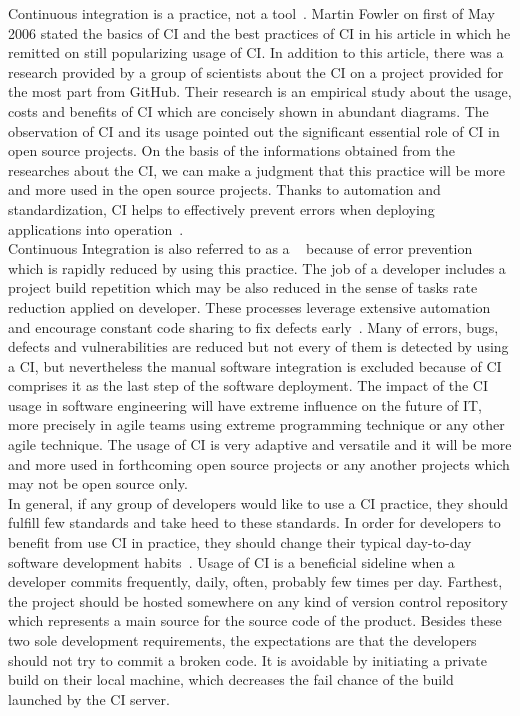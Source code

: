 Continuous integration is a practice, not a tool~\cite{CollabNet}. Martin Fowler on first of May 2006 stated the basics of CI and the best practices of CI in his article in which he remitted on still popularizing usage of CI. In addition to this article, there was a research provided by a group of scientists about the CI on a project provided for the most part from GitHub. Their research is an empirical study about the usage, costs and benefits of CI which are concisely shown in abundant diagrams. The observation of CI and its usage pointed out the significant essential role of CI in open source projects. On the basis of the informations obtained from the researches about the CI, we can make a judgment that this practice will be more and more used in the open source projects. Thanks to automation and standardization, CI helps to effectively prevent errors when deploying applications into operation~\cite{CIcure}.\\

Continuous Integration is also referred to as a ~\cite{CIcure} because of error prevention which is rapidly reduced by using this practice. The job of a developer includes a project build repetition which may be also reduced in the sense of tasks rate reduction applied on developer. These processes leverage extensive automation and encourage constant code sharing to fix defects early~\cite{DigitalOceanCI}. Many of errors, bugs, defects and vulnerabilities are reduced but not every of them is detected by using a CI, but nevertheless the manual software integration is excluded because of CI comprises it as the last step of the software deployment. The impact of the CI usage in software engineering will have extreme influence on the future of IT, more precisely in agile teams using extreme programming technique or any other agile technique. The usage of CI is very adaptive and versatile and it will be more and more used in forthcoming open source projects or any another projects which may not be open source only.\\

In general, if any group of developers would like to use a CI practice, they should fulfill few standards and take heed to these standards. In order for developers to benefit from use CI in practice, they should change their typical day-to-day software development habits~\cite{CIQualityFramework}. Usage of CI is a beneficial sideline when a developer commits frequently, daily, often, probably few times per day. Farthest, the project should be hosted somewhere on any kind of version control repository which represents a main source for the source code of the product. Besides these two sole development requirements, the expectations are that the developers should not try to commit a broken code. It is avoidable by initiating a private build on their local machine, which decreases the fail chance of the build launched by the CI server.\\

